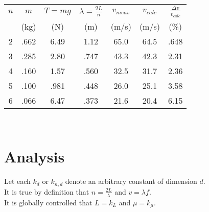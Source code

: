 \documentclass{article}
\begin{document}
\begin{center}
\begin{tabular}{ |c|c||c|c|c|c|c|}
    \hline
    $n$ & $m$ & $T=mg$ & $\lambda=\frac{2L}{n}$ & $v_{meas}$ & $v_{calc}$ & $\frac{\Delta v}{v_{calc}}$ \\
    & (kg) & (N) & (m) & (m/s) & (m/s) & (\%) \\
    \hline
    2 & .662 & 6.49 & 1.12 & 65.0 & 64.5 & .648 \\
    \hline
    3 & .285 & 2.80 & .747 & 43.3 & 42.3 & 2.31 \\
    \hline
    4 & .160 & 1.57 & .560 & 32.5 & 31.7 & 2.36 \\
    \hline
    5 & .100 & .981 & .448 & 26.0 & 25.1 & 3.58 \\
    \hline
    6 & .066 & 6.47 & .373 & 21.6 & 20.4 & 6.15 \\
    \hline
\end{tabular}
\end{center}



 \\


\section{Analysis}

Let each $k_d$ or $k_{n,d}$ denote an arbitrary constant of dimension $d$. \\

It is true by definition that $n = \frac{2L}{\lambda}$ and $v = \lambda f$. \\

It is globally controlled that $L = k_L$ and $\mu = k_\mu$. \\
\end{document}
